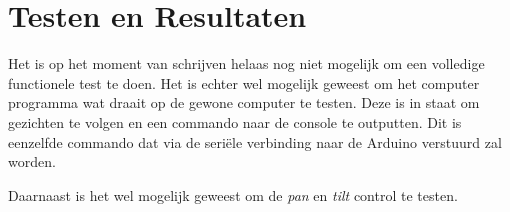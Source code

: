 \chapter{Testen en Resultaten}
\label{ch:testing}

Het is op het moment van schrijven helaas nog niet mogelijk om een volledige
functionele test te doen. Het is echter wel mogelijk geweest om het computer
programma wat draait op de gewone computer te testen. Deze is in staat om
gezichten te volgen en een commando naar de console te outputten. Dit is
eenzelfde commando dat via de seriële verbinding naar de Arduino verstuurd
zal worden.

Daarnaast is het wel mogelijk geweest om de \emph{pan} en \emph{tilt} control
te testen.
